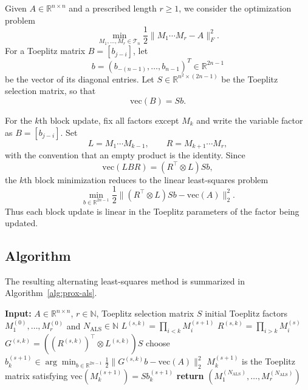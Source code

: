 \documentclass[reqno]{amsart}
\theoremstyle{definition}
\newcommand{\R}{\mathbb{R}}
\newcommand{\vect}{\mathrm{vec}}
\numberwithin{equation}{section}
\begin{document}
Given $A\in\R^{n\times n}$ and a prescribed length $r\geq 1$, we consider the optimization problem
\begin{equation}\label{eq:main_obj_mat}
\min_{M_1,\ldots,M_r\in\mathcal{T}_n}
\frac12\|M_1\cdots M_r-A\|_F^2.
\end{equation}
For a Toeplitz matrix $B=[b_{j-i}]$, let
\[
b=(b_{-(n-1)},\ldots,b_{n-1})^T\in\R^{2n-1}
\]
be the vector of its diagonal entries. 
Let $S\in\R^{n^2\times(2n-1)}$ be the Toeplitz selection matrix, so that
\[
\vect(B)=Sb.
\]

For the $k$th block update, fix all factors except $M_k$ and write the variable factor as $B=[b_{j-i}]$. Set
\[
L=M_1\cdots M_{k-1},\qquad R=M_{k+1}\cdots M_r,
\]
with the convention that an empty product is the identity. Since
\[
\vect(LBR)=(R^\top\otimes L)Sb,
\]
the $k$th block minimization reduces to the linear least-squares problem
\begin{equation}\label{eq:block_toeplitz_subproblem}
\min_{b\in\R^{2n-1}}
\frac12\|(R^\top\otimes L)Sb-\vect(A)\|_2^2.
\end{equation}
Thus each block update is linear in the Toeplitz parameters of the factor being updated.

\subsection{Algorithm}

The resulting alternating least-squares method is summarized in Algorithm~\ref{alg:prox-als}.

\begin{algorithm}
\caption{Alternating least-squares updates for Toeplitz factors}
\label{alg:prox-als}
\begin{algorithmic}[1]
\State \textbf{Input:} $A \in \mathbb{R}^{n \times n}$, $r \in \mathbb{N}$, Toeplitz selection matrix $S$
\State initial Toeplitz factors $M_1^{(0)},\dots,M_r^{(0)}$ and $N_{\mathrm{ALS}} \in \mathbb{N}$
        \State $L^{(s,k)} = \prod_{i<k} M_i^{(s+1)}$
        \State $R^{(s,k)} = \prod_{i>k} M_i^{(s)}$
        \State $G^{(s,k)} = ((R^{(s,k)})^\top \otimes L^{(s,k)})S$
        \State choose $b_k^{(s+1)} \in \arg\min_{b \in \mathbb{R}^{2n-1}} \frac12\|G^{(s,k)}b-\vect(A)\|_2^2$
        \State $M_k^{(s+1)}$ is the Toeplitz matrix satisfying $\vect(M_k^{(s+1)})=Sb_k^{(s+1)}$
    \EndFor
\EndFor
\State \textbf{return} $(M_1^{(N_{\mathrm{ALS}})},\dots,M_r^{(N_{\mathrm{ALS}})})$
\end{algorithmic}
\end{algorithm}
\end{document}
